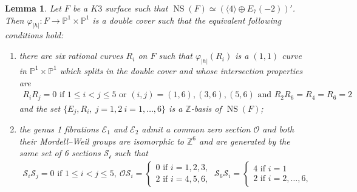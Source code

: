 \documentclass{amsart}
\newtheorem{lemma}[thm]{Lemma}
\theoremstyle{definition}
\numberwithin{equation}{section}
\numberwithin{equation}{section} \theoremstyle{definition}
\DeclareMathOperator{\NS}{NS}
\newcommand{\ra}{\rightarrow}
\newcommand\Z{\mathbb{Z}}
\begin{document}
\begin{lemma}\label{lem: decrip F (4+G)'}
Let $F$ be a $K3$ surface such that $\NS(F)\simeq (\langle 4\rangle\oplus E_7(-2))'$. Then $\varphi_{|h|}:F\ra \mathbb{P}^1\times \mathbb{P}^1$ is a double cover such that the equivalent following conditions hold: \begin{enumerate}\item there are six rational curves $R_i$ on $F$ such that $\varphi_{|h|}(R_i)$ is a $(1,1)$ curve in $\mathbb{P}^1\times \mathbb{P}^1$ which splits in the double cover and whose intersection properties are \begin{eqnarray}\label{eq: int Ri's}R_iR_j=0\mbox{ if }1\leq i<j\leq 5\mbox{ or }(i,j)=(1,6),(3,6),(5,6)\mbox{ and }R_2R_6=R_4=R_6=2\end{eqnarray} and the set $\{E_j,R_i,\ j=1,2\ i=1,\ldots, 6\}$ is a $\Z$-basis of $\NS(F)$; \item the genus 1 fibrations $\mathcal{E}_1$ and $\mathcal{E}_2$ admit a common zero section $\mathcal{O}$ and both their Mordell--Weil groups are isomorphic to  $\Z^6$ and are generated by the same set of 6 sections $\mathcal{S_i}$ such that \begin{eqnarray}\label{eq: int sections 4'}\mathcal{S}_i\mathcal{S}_j=0\mbox{ if }1\leq i<j\leq 5,\ \mathcal{O}\mathcal{S}_i=\left\{\begin{array}{l}0\mbox{ if }i=1,2,3,\\2\mbox{ if }i=4,5,6,\end{array}\right.\  \mathcal{S}_6\mathcal{S}_i=\left\{\begin{array}{l}4\mbox{ if }i=1\\2\mbox{ if }i=2,\ldots,6,\end{array}\right. \end{eqnarray}\end{enumerate}
\end{lemma}
\end{document}
